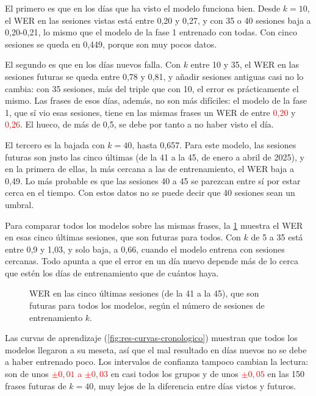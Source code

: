 El primero es que en los días que ha visto el modelo funciona bien. Desde $k = 10$, el WER en las sesiones vistas está entre 0,20 y 0,27, y con 35 o 40 sesiones baja a 0,20-0,21, lo mismo que el modelo de la fase 1 entrenado con todas. Con cinco sesiones se queda en 0,449, porque son muy pocos datos.

El segundo es que en los días nuevos falla. Con $k$ entre 10 y 35, el WER en las sesiones futuras se queda entre 0,78 y 0,81, y añadir sesiones antiguas casi no lo cambia: con 35 sesiones, más del triple que con 10, el error es prácticamente el mismo. Las frases de esos días, además, no son más difíciles: el modelo de la fase 1, que sí vio esas sesiones, tiene en las mismas frases un WER de entre \textcolor{red}{0,20} y \textcolor{red}{0,26}. El hueco, de más de 0,5, se debe por tanto a no haber visto el día.

El tercero es la bajada con $k = 40$, hasta 0,657. Para este modelo, las sesiones futuras son justo las cinco últimas (de la 41 a la 45, de enero a abril de 2025), y en la primera de ellas, la más cercana a las de entrenamiento, el WER baja a 0,49. Lo más probable es que las sesiones 40 a 45 se parezcan entre sí por estar cerca en el tiempo. Con estos datos no se puede decir que 40 sesiones sean un umbral.

Para comparar todos los modelos sobre las mismas frases, la \cref{fig:res-ultimas} muestra el WER en esas cinco últimas sesiones, que son futuras para todos. Con $k$ de 5 a 35 está entre 0,9 y 1,03, y solo baja, a 0,66, cuando el modelo entrena con sesiones cercanas. Todo apunta a que el error en un día nuevo depende más de lo cerca que estén los días de entrenamiento que de cuántos haya.

\begin{figure}[htbp]
  \centering
  \caption{WER en las cinco últimas sesiones (de la 41 a la 45), que son futuras para todos los modelos, según el número de sesiones de entrenamiento $k$.}
  \label{fig:res-ultimas}
\end{figure}

Las curvas de aprendizaje (\cref{fig:res-curvas-cronologico}) muestran que todos los modelos llegaron a su meseta, así que el mal resultado en días nuevos no se debe a haber entrenado poco. Los intervalos de confianza tampoco cambian la lectura: son de unos \textcolor{red}{$\pm 0{,}01$ a $\pm 0{,}03$} en casi todos los grupos y de unos \textcolor{red}{$\pm 0{,}05$} en las 150 frases futuras de $k = 40$, muy lejos de la diferencia entre días vistos y futuros.


